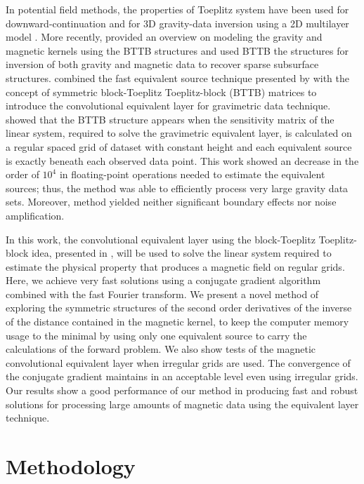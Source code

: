 \documentclass[manuscript,noblind]{geophysics}
\begin{document}
In potential field methods, the properties of Toeplitz system have been used for downward-continuation \citep{zhang-etal2016} and for 3D gravity-data inversion using a 2D multilayer model \citep{zhang-wong2015}. More recently, \cite{hogue2020tutorial} provided an overview on modeling the gravity and magnetic kernels using the BTTB structures and \cite{renaut2020fast} used BTTB the structures for inversion of both gravity and magnetic data to recover sparse subsurface structures.
\cite{takahashi2020convolutional} combined the fast equivalent source technique presented by \cite{siqueira-etal2017} with the concept of symmetric block-Toeplitz Toeplitz-block (BTTB) matrices to introduce the convolutional equivalent layer for gravimetric data technique. 
\cite{takahashi2020convolutional} showed that the BTTB structure appears when the sensitivity matrix of the linear system, required to solve the gravimetric equivalent layer, is calculated on a regular spaced grid of dataset with constant height and each equivalent source is exactly beneath each observed data point. 
This work showed an decrease in the order of $10^4$ in floating-point operations needed to estimate the equivalent sources; thus, the \cite{takahashi2020convolutional} method was able to efficiently process very large gravity data sets. 
Moreover, \cite{takahashi2020convolutional} method yielded neither significant boundary effects nor noise amplification.

In this work, the convolutional equivalent layer using the block-Toeplitz Toeplitz-block idea, presented in \cite{takahashi2020convolutional}, will be used to solve the linear system required to estimate the physical property that produces a magnetic field on regular grids. 
Here, we achieve very fast solutions using a conjugate gradient algorithm combined with the fast Fourier transform. We present a novel method of exploring the symmetric structures of the second order derivatives of the inverse of the distance contained in the magnetic kernel, to keep the computer memory usage to the minimal by using only one equivalent source to carry the calculations of the forward problem. We also show tests of the magnetic convolutional equivalent layer when irregular grids are used. The convergence of the conjugate gradient maintains in an acceptable level even using irregular grids. 
Our results show a good performance of our method in producing fast and robust solutions for processing large amounts of magnetic data using the equivalent layer technique.


\section{Methodology}
\end{document}
